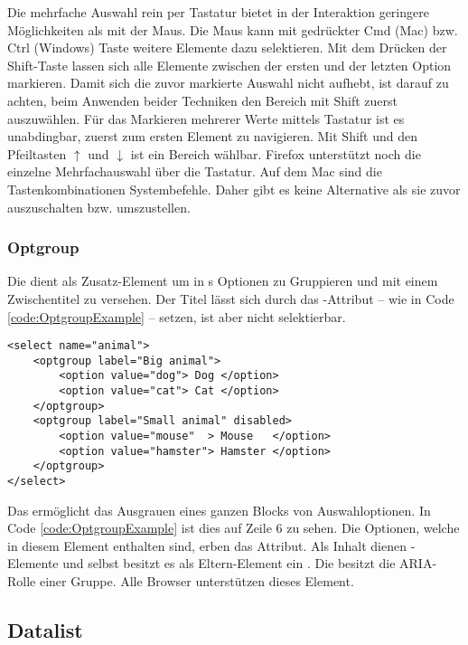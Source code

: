Die mehrfache Auswahl rein per Tastatur bietet in der Interaktion geringere Möglichkeiten als mit der Maus.
Die Maus kann mit gedrückter Cmd (Mac) bzw. Ctrl (Windows) Taste weitere Elemente dazu selektieren.
Mit dem Drücken der Shift-Taste lassen sich alle Elemente zwischen der ersten und der letzten Option markieren.
Damit sich die zuvor markierte Auswahl nicht aufhebt, ist darauf zu achten, beim Anwenden beider Techniken den Bereich mit Shift zuerst auszuwählen.
Für das Markieren mehrerer Werte mittels Tastatur ist es unabdingbar, zuerst zum ersten Element zu navigieren.
Mit Shift und den Pfeiltasten $\uparrow$ und $\downarrow$ ist ein Bereich wählbar.
Firefox unterstützt noch die einzelne Mehrfachauswahl über die Tastatur.
Auf dem Mac sind die Tastenkombinationen Systembefehle.
Daher gibt es keine Alternative als sie zuvor auszuschalten bzw. umszustellen.


\subsubsection{\color{dgray} Optgroup}
\label{sec:optgroup}

Die  dient als Zusatz-Element um in s Optionen zu Gruppieren und mit einem Zwischentitel zu versehen.
Der Titel lässt sich durch das -Attribut – wie in Code \ref{code:OptgroupExample} – setzen, ist aber nicht selektierbar. 

\begin{lstlisting}[style = htmlcssjs, caption = Optgroup Beispiel, label = code:OptgroupExample]
<select name="animal">
    <optgroup label="Big animal">
        <option value="dog"> Dog </option>
        <option value="cat"> Cat </option>
    </optgroup>
    <optgroup label="Small animal" disabled>
        <option value="mouse"  > Mouse   </option>
        <option value="hamster"> Hamster </option>
    </optgroup>
</select>
\end{lstlisting}

Das  ermöglicht das Ausgrauen eines ganzen Blocks von Auswahloptionen.
In Code \ref{code:OptgroupExample} ist dies auf Zeile 6 zu sehen.
Die Optionen, welche in diesem Element enthalten sind, erben das Attribut.
Als Inhalt dienen -Elemente und selbst besitzt es als Eltern-Element ein .
Die  besitzt die ARIA-Rolle einer Gruppe.
Alle Browser unterstützen dieses Element.


\subsection{Datalist}
\label{sec:datalist}

